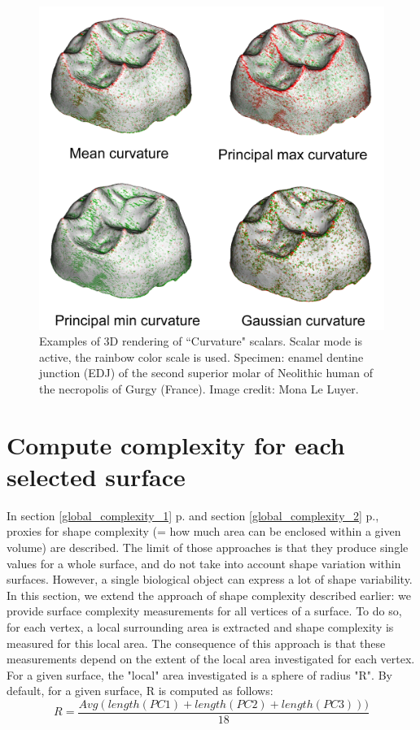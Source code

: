 \begin{figure}
  \centering
  \includegraphics[scale=0.3]{images/11/curvature_example.png} 
	\caption{
Examples of 3D rendering of ``Curvature" scalars. Scalar mode is active, the rainbow color scale is used. Specimen: enamel dentine junction (EDJ) of the second superior molar of Neolithic human of the necropolis of Gurgy (France). Image credit: Mona Le Luyer.}
\label{curvature_example}
 
\end{figure}

\section{Compute complexity for each selected surface}
In section \ref{global_complexity_1} p.\pageref{global_complexity_1} and section \ref{global_complexity_2} p.\pageref{global_complexity_2}, proxies for shape complexity (= how much area can be enclosed within a given volume) are described. The limit of those approaches is that they produce single values for a whole surface, and do not take into account shape variation within surfaces. However, a single biological object can express a lot of shape variability. In this section, we extend the approach of shape complexity described earlier: we provide surface complexity measurements for all vertices of a surface. To do so, for each vertex, a local surrounding area is extracted and shape complexity is measured for this local area. The consequence of this approach is that these measurements depend on the extent of the local area investigated for each vertex. For a given surface, the "local" area investigated is a sphere of radius "R".  By default, for a given surface, R is computed as follows:
\begin{equation}
R = \dfrac{Avg(length(PC1)+length(PC2)+length(PC3)))}{18}
\end{equation}
 
